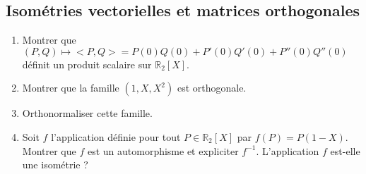 \documentclass[a4paper,twoside,french,11pt]{VcCours}
\begin{document}

\tableofcontents
\separationTitre


\subsection{Isométries vectorielles et matrices orthogonales}


\begin{Exercice}{} 
\begin{enumerate}
\item Montrer que $(P,Q) \mapsto <P,Q> = P(0)Q(0)+ P'(0)Q'(0)+P''(0)Q''(0)$ définit un produit scalaire sur $\mathbb{R}_2[X]$.
\item Montrer que la famille $(1,X,X^2)$ est orthogonale.
\item Orthonormaliser cette famille.
\item Soit $f$ l'application définie pour tout $P \in \mathbb{R}_2[X]$ par $f(P)=P(1-X)$. Montrer que $f$ est un automorphisme et expliciter $f^{-1}$. L'application $f$ est-elle une isométrie ?
\end{enumerate}
\end{Exercice}
\end{document}
